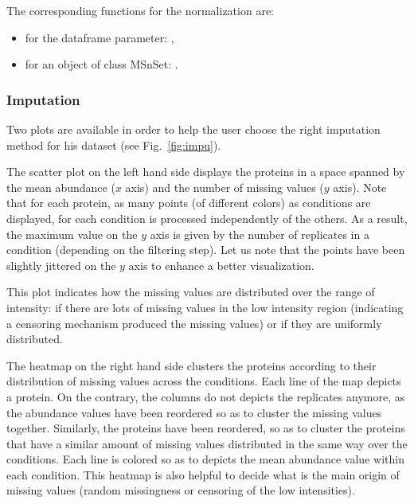 \documentclass[12pt]{article}
\begin{document}
{The corresponding functions for the normalization are:
\begin{itemize}
\item for the dataframe parameter: ,
\item for an object of class MSnSet: .
\end{itemize}

\subsubsection{Imputation}\label{imputation}

Two plots are available in order to help the user choose the right 
imputation method for his dataset (see Fig.~\ref{fig:impu}).


The scatter plot on the left hand side displays the proteins in a space 
spanned by the mean abundance ($x$ axis) and the number of missing values 
($y$ axis). Note that for each protein, as many points (of different colors) 
as conditions are displayed, for each condition is processed independently of 
the others. As a result, the maximum value on the $y$ axis is given by the 
number of replicates in a condition (depending on the filtering step). Let 
us note that the points have been slightly jittered on the $y$ axis to 
enhance a better visualization.

This plot indicates how the missing values are distributed over the range of 
intensity: if there are lots of missing values in the low intensity region 
(indicating a censoring mechanism produced the missing values) or if they are 
uniformly distributed. 


The heatmap on the right hand side clusters the proteins according to their 
distribution of missing values across the conditions. Each line of the map 
depicts a protein. On the contrary, the columns do not depicts the replicates 
anymore, as the abundance values have been reordered so as to cluster the 
missing values together. Similarly, the proteins have been reordered, so as 
to cluster the proteins that have a similar amount of missing values 
distributed in the same way over the conditions. Each line is colored so as 
to depicts the mean abundance value within each condition. This heatmap is 
also helpful to decide what is the main origin of missing values (random 
missingness or censoring of the low intensities).


}
\end{document}
